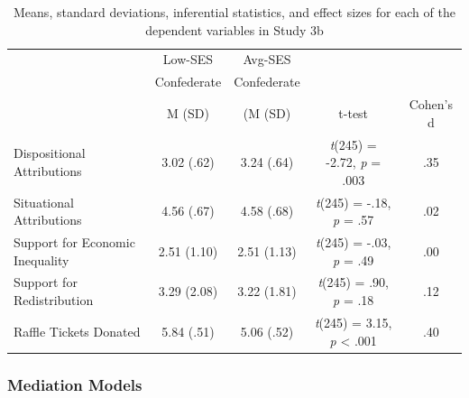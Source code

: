\documentclass{sfuthesis}
\begin{document}
\begin{table}[h]
  \begin{center}
    \caption{Means, standard deviations, inferential statistics, and effect sizes for each of the dependent variables in Study 3b}
    \label{tab:eighthtable}
    \begin{tabular}{l c c c c}
    \hline
      & \multicolumn{1}{c}{Low-SES} & \multicolumn{1}{c}{Avg-SES} & & \\
      & \multicolumn{1}{c}{Confederate} & \multicolumn{1}{c}{Confederate} & & \\\cmidrule{2-3}
      & \multicolumn{1}{c}{M (SD)} & \multicolumn{1}{c}{(M (SD)} & t-test & Cohen's d\\
      \hline
      Dispositional Attributions & \multicolumn{1}{c}{3.02 (.62)} & \multicolumn{1}{c}{3.24 (.64)} & \multicolumn{1}{c}{\textit{t}(245) = -2.72, \textit{p} = .003} & .35\\
      Situational Attributions & \multicolumn{1}{c}{4.56 (.67)} & \multicolumn{1}{c}{4.58 (.68)} & \multicolumn{1}{c}{\textit{t}(245) = -.18, \textit{p} = .57} & .02\\
      Support for Economic Inequality & \multicolumn{1}{c}{2.51 (1.10)} & \multicolumn{1}{c}{2.51 (1.13)} & \multicolumn{1}{c}{\textit{t}(245) = -.03, \textit{p} = .49} & .00\\
      Support for Redistribution & \multicolumn{1}{c}{3.29 (2.08)} & \multicolumn{1}{c}{3.22 (1.81)} & \multicolumn{1}{c}{\textit{t}(245) = .90, \textit{p} = .18} & .12\\
      Raffle Tickets Donated & \multicolumn{1}{c}{5.84 (.51)} & \multicolumn{1}{c}{5.06 (.52)} & \multicolumn{1}{c}{\textit{t}(245) = 3.15, \textit{p} < .001} & .40\\
      \hline
    \end{tabular}
  \end{center}
\end{table}

\subsubsection{Mediation Models}
\end{document}
